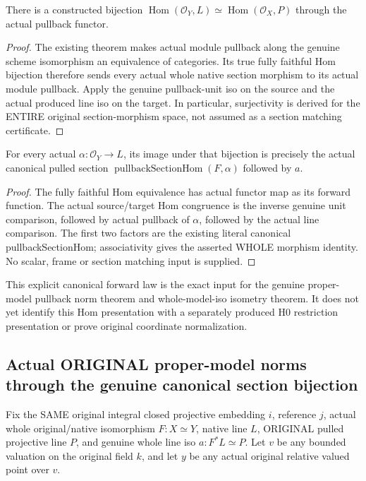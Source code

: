 \begin{definition}
\label{def:seven-original-native-canonical-whole-section-homs-route}
\leanok
{}
There is a constructed bijection
$\operatorname{Hom}(\mathcal O_Y,L)\simeq
 \operatorname{Hom}(\mathcal O_X,P)$ through the actual pullback functor.
\end{definition}
\begin{proof}
The existing theorem makes actual module pullback along the genuine scheme
isomorphism an equivalence of categories. Its true fully faithful Hom
bijection therefore sends every actual whole native section morphism to
its actual module pullback. Apply the genuine pullback-unit iso on the
source and the actual produced line iso on the target. In particular,
surjectivity is derived for the ENTIRE original section-morphism space,
not assumed as a section matching certificate.
\end{proof}

\begin{theorem}
\label{thm:seven-original-native-canonical-whole-section-homs-forward-route}
\leanok
{}
For every actual $\alpha:\mathcal O_Y\to L$, its image under that bijection
is precisely the actual canonical pulled section
$\operatorname{pullbackSectionHom}(F,\alpha)$ followed by $a$.
\end{theorem}
\begin{proof}
The fully faithful Hom equivalence has actual functor map as its forward
function. The actual source/target Hom congruence is the inverse genuine
unit comparison, followed by actual pullback of $\alpha$, followed by the
actual line comparison. The first two factors are the existing literal
canonical pullbackSectionHom; associativity gives the asserted WHOLE
morphism identity. No scalar, frame or section matching input is supplied.
\end{proof}

This explicit canonical forward law is the exact input for the genuine
proper-model pullback norm theorem and whole-model-iso isometry theorem.
It does not yet identify this Hom presentation with a separately produced
H0 restriction presentation or prove original coordinate normalization.
\subsection{Actual ORIGINAL proper-model norms through the genuine canonical section bijection}
Fix the SAME original integral closed projective embedding $i$, reference
$j$, actual whole original/native isomorphism $F:X\simeq Y$, native line
$L$, ORIGINAL pulled projective line $P$, and genuine whole line iso
$a:F^*L\simeq P$. Let $v$ be any bounded valuation on the original field
$k$, and let $y$ be any actual original relative valued point over $v$.

